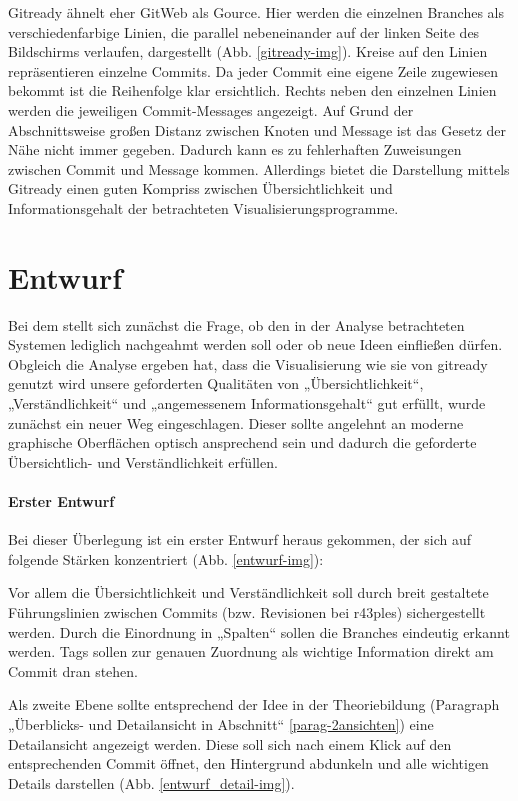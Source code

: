 \documentclass[color, ddc]{tudscrreprt}
\begin{document}
	Gitready ähnelt eher GitWeb als Gource. Hier werden die einzelnen Branches als verschiedenfarbige Linien, die parallel nebeneinander auf der linken Seite des Bildschirms verlaufen, dargestellt (Abb. \ref{gitready-img}). Kreise auf den Linien repräsentieren einzelne Commits. Da jeder Commit eine eigene Zeile zugewiesen bekommt ist die Reihenfolge klar ersichtlich. Rechts neben den einzelnen Linien werden die jeweiligen Commit-Messages angezeigt. Auf Grund der Abschnittsweise großen Distanz zwischen Knoten und Message ist das Gesetz der Nähe nicht immer gegeben. Dadurch kann es zu fehlerhaften Zuweisungen zwischen Commit und Message kommen. Allerdings bietet die Darstellung mittels Gitready einen guten Kompriss zwischen Übersichtlichkeit und Informationsgehalt der betrachteten Visualisierungsprogramme. 

\section{Entwurf}	

Bei dem stellt sich zunächst die Frage, ob den in der Analyse betrachteten Systemen lediglich nachgeahmt werden soll oder ob neue Ideen einfließen dürfen. Obgleich die Analyse ergeben hat, dass die Visualisierung wie sie von gitready genutzt wird unsere geforderten Qualitäten von „Übersichtlichkeit“, „Verständlichkeit“ und „angemessenem Informationsgehalt“ gut erfüllt, wurde zunächst ein neuer Weg eingeschlagen. Dieser sollte angelehnt an moderne graphische Oberflächen optisch ansprechend sein und dadurch die geforderte Übersichtlich- und Verständlichkeit erfüllen.

\paragraph{Erster Entwurf}
Bei dieser Überlegung ist ein erster Entwurf heraus gekommen, der sich auf folgende Stärken konzentriert (Abb. \ref{entwurf-img}):

Vor allem die Übersichtlichkeit und Verständlichkeit soll durch breit gestaltete Führungslinien zwischen Commits (bzw. Revisionen bei r43ples) sichergestellt werden. Durch die Einordnung in „Spalten“ sollen die Branches eindeutig erkannt werden. Tags sollen zur genauen Zuordnung als wichtige Information direkt am Commit dran stehen.

Als zweite Ebene sollte entsprechend der Idee in der Theoriebildung (Paragraph „Überblicks- und Detailansicht in Abschnitt“ \ref{parag-2ansichten}) eine Detailansicht angezeigt werden. Diese soll sich nach einem Klick auf den entsprechenden Commit öffnet, den Hintergrund abdunkeln und alle wichtigen Details darstellen (Abb. \ref{entwurf_detail-img}).
\end{document}

